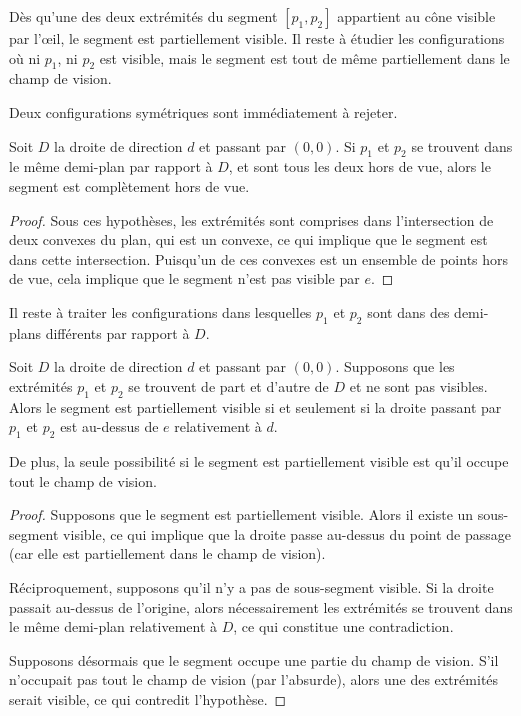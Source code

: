 Dès qu'une des deux extrémités du segment $[p_1, p_2]$ appartient au
cône visible par l'\oe{}il, le segment est partiellement
visible. Il reste à étudier les configurations où ni $p_1$, ni $p_2$ est
visible, mais le segment est tout de même partiellement dans le champ de vision.

Deux configurations symétriques sont immédiatement à rejeter.
\begin{obs}
  Soit $D$ la droite de direction $d$ et passant par $(0, 0)$.
  Si $p_1$ et $p_2$ se trouvent dans le même demi-plan par rapport à $D$,
  et sont tous les deux hors de vue, alors le segment est complètement hors de vue.
\end{obs}
\begin{proof}
  Sous ces hypothèses, les extrémités sont comprises dans l'intersection
  de deux convexes du plan, qui est un convexe, ce qui implique
  que le segment est dans cette intersection. Puisqu'un de ces convexes
  est un ensemble de points hors de vue, cela implique que le segment
  n'est pas visible par $e$.
\end{proof}

Il reste à traiter les configurations dans lesquelles $p_1$
et $p_2$ sont dans des demi-plans différents par rapport à $D$.

\begin{obs}
  Soit $D$ la droite de direction $d$ et passant par $(0, 0)$.
  Supposons que les extrémités $p_1$ et $p_2$ se trouvent
  de part et d'autre de $D$ et ne sont pas visibles.
  Alors le segment est partiellement visible
  si et seulement si la droite passant par $p_1$
  et $p_2$ est \og au-dessus\fg{} de $e$ relativement à $d$.

  De plus, la seule possibilité si le segment est partiellement
  visible est qu'il occupe tout le champ de vision.
\end{obs}

\begin{proof}
  Supposons que le segment est partiellement visible. Alors il existe
  un sous-segment visible, ce qui implique que la droite passe
  au-dessus du point de passage (car elle est partiellement dans le champ
  de vision).

  Réciproquement, supposons qu'il n'y a pas de sous-segment visible.
  Si la droite passait au-dessus de l'origine, alors nécessairement
  les extrémités se trouvent dans le même demi-plan relativement à $D$,
  ce qui constitue une contradiction.

  Supposons désormais que le segment occupe une partie du champ de vision.
  S'il n'occupait pas tout le champ de vision (par l'absurde), alors
  une des extrémités serait visible, ce qui contredit l'hypothèse.
\end{proof}

